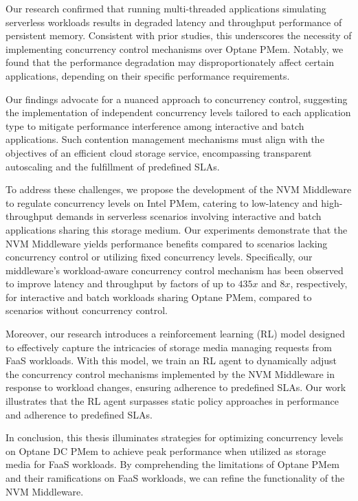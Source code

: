 Our research confirmed that running multi-threaded applications simulating serverless workloads results in degraded latency and throughput performance of persistent memory. Consistent with prior studies, this underscores the necessity of implementing concurrency control mechanisms over Optane PMem. Notably, we found that the performance degradation may disproportionately affect certain applications, depending on their specific performance requirements.

Our findings advocate for a nuanced approach to concurrency control, suggesting the implementation of independent concurrency levels tailored to each application type to mitigate performance interference among interactive and batch applications. Such contention management mechanisms must align with the objectives of an efficient cloud storage service, encompassing transparent autoscaling and the fulfillment of predefined SLAs.

To address these challenges, we propose the development of the NVM Middleware to regulate concurrency levels on Intel PMem, catering to low-latency and high-throughput demands in serverless scenarios involving interactive and batch applications sharing this storage medium. Our experiments demonstrate that the NVM Middleware yields performance benefits compared to scenarios lacking concurrency control or utilizing fixed concurrency levels. Specifically, our middleware's workload-aware concurrency control mechanism has been observed to improve latency and throughput by factors of up to $435x$ and $8x$, respectively, for interactive and batch workloads sharing Optane PMem, compared to scenarios without concurrency control.


Moreover, our research introduces a reinforcement learning (RL) model designed to effectively capture the intricacies of storage media managing requests from FaaS workloads. With this model, we train an RL agent to dynamically adjust the concurrency control mechanisms implemented by the NVM Middleware in response to workload changes, ensuring adherence to predefined SLAs. Our work illustrates that the RL agent surpasses static policy approaches in performance and adherence to predefined SLAs.

In conclusion, this thesis illuminates strategies for optimizing concurrency levels on Optane DC PMem to achieve peak performance when utilized as storage media for FaaS workloads. By comprehending the limitations of Optane PMem and their ramifications on FaaS workloads, we can refine the functionality of the NVM Middleware.